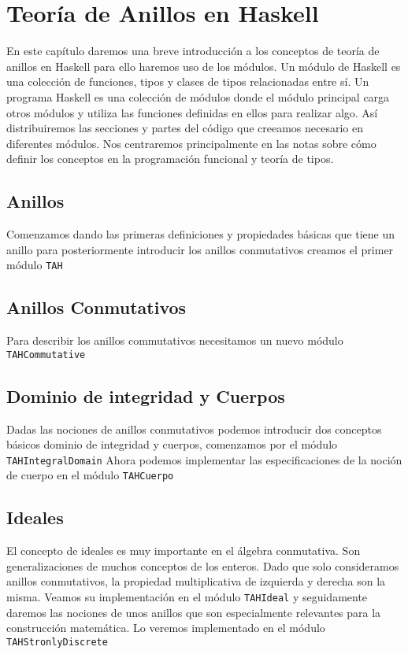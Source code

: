 \chapter{Teoría de Anillos en Haskell}
En este capítulo daremos una breve introducción a los conceptos de teoría de anillos en Haskell para ello haremos uso de los módulos. Un módulo de Haskell es una colección de funciones, tipos y clases de tipos relacionadas entre sí. Un programa Haskell es una colección de módulos donde el módulo principal carga otros módulos y utiliza las funciones definidas en ellos para realizar algo. Así distribuiremos las secciones y partes del código que creeamos necesario en diferentes módulos. Nos centraremos principalmente en las notas sobre cómo definir los conceptos en la programación funcional y teoría de tipos.

\section{Anillos}
Comenzamos dando las primeras definiciones y propiedades básicas que tiene un anillo para posteriormente introducir los anillos conmutativos creamos el primer módulo \texttt{TAH}

\section{Anillos Conmutativos}
Para describir los anillos commutativos necesitamos un nuevo módulo \texttt{TAHCommutative}
\section{Dominio de integridad y Cuerpos}
Dadas las nociones de anillos conmutativos podemos introducir dos conceptos básicos dominio de integridad y cuerpos, comenzamos por el módulo \texttt{TAHIntegralDomain} Ahora podemos implementar las especificaciones de la noción de cuerpo en el módulo \texttt{TAHCuerpo}

\section{Ideales}
El concepto de ideales es muy importante en el álgebra conmutativa. Son
generalizaciones de muchos conceptos de los enteros. Dado que solo consideramos anillos conmutativos, 
la propiedad multiplicativa de izquierda y derecha son la misma. Veamos su implementación en el módulo \texttt{TAHIdeal}
y seguidamente daremos las nociones de unos anillos que son especialmente relevantes para la construcción matemática. Lo veremos implementado en el módulo \texttt{TAHStronlyDiscrete}

